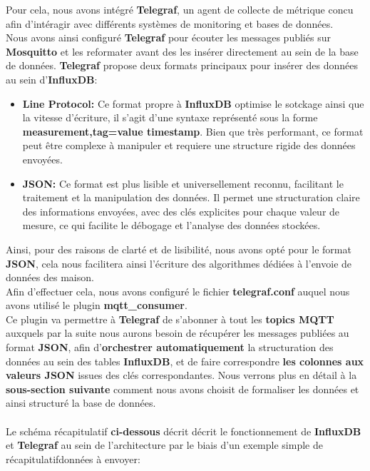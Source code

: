 \documentclass[10pt, a4paper]{report}
\begin{document}
	Pour cela, nous avons intégré \textbf{Telegraf}, un agent de collecte de métrique concu afin d'intéragir avec différents systèmes de monitoring et bases de données.\\
	Nous avons ainsi configuré \textbf{Telegraf} pour écouter les messages publiés sur \textbf{Mosquitto} et les reformater avant des les insérer directement au sein de la base de données.\newpage
	\textbf{Telegraf} propose deux formats principaux pour insérer des données au sein d'\textbf{InfluxDB}:
	\begin{itemize}
		\item \textbf{Line Protocol:} Ce format propre à \textbf{InfluxDB} optimise le sotckage ainsi que la vitesse d'écriture, il s'agit d'une syntaxe représenté sous la forme \textbf{measurement,tag=value timestamp}. Bien que très performant, ce format peut être complexe à manipuler et requiere une structure rigide des données envoyées.
		
		\item \textbf{JSON:} Ce format est plus lisible et universellement reconnu, facilitant le traitement et la manipulation des données. Il permet une structuration claire des informations envoyées, avec des clés explicites pour chaque valeur de mesure, ce qui facilite le débogage et l’analyse des données stockées.
	\end{itemize}
	Ainsi, pour des raisons de clarté et de lisibilité, nous avons opté pour le format \textbf{JSON}, cela nous facilitera ainsi l'écriture des algorithmes dédiées à l'envoie de données des maison.\\
	Afin d'effectuer cela, nous avons configuré le fichier \textbf{telegraf.conf} auquel nous avons utilisé le plugin \textbf{mqtt\_consumer}.\\
	Ce plugin va permettre à \textbf{Telegraf} de s'abonner à tout les \textbf{topics MQTT} auxquels par la suite nous aurons besoin de récupérer les messages publiées au format \textbf{JSON}, afin d'\textbf{orchestrer automatiquement} la structuration des données au sein des tables \textbf{InfluxDB}, et de faire correspondre \textbf{les colonnes aux valeurs JSON} issues des clés correspondantes. Nous verrons plus en détail à la \textbf{sous-section suivante} comment nous avons choisit de formaliser les données et ainsi structuré la base de données.\\\\
	Le schéma récapitulatif \textbf{ci-dessous} décrit décrit le fonctionnement de \textbf{InfluxDB} et \textbf{Telegraf} au sein de l'architecture par le biais d'un exemple simple de récapitulatifdonnées à envoyer:
	
\end{document}
